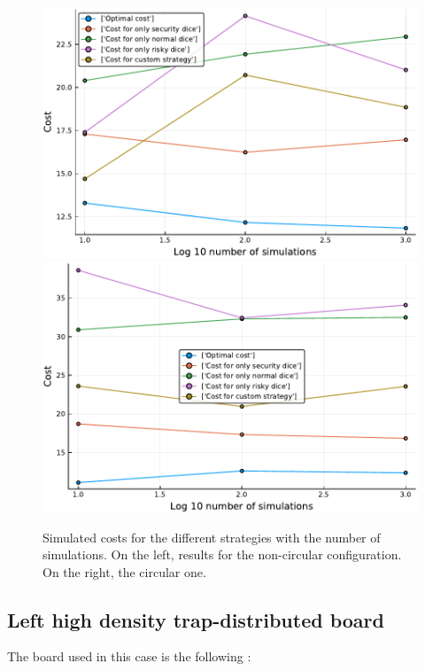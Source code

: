 \begin{figure}[H]
\centering
\includegraphics[scale=0.41]{../img/board_right_high/cost_subopt_log_noncirc.pdf}
\includegraphics[scale=0.41]{../img/board_right_high/cost_subopt_log_circ.pdf}
\caption{Simulated costs for the different strategies with the number of simulations. On the left, results for the non-circular configuration. On the right, the circular one.}
\label{fig:cost_subopt_log_right}
\end{figure}


\subsection{Left high density trap-distributed board}

The board used in this case is the following :

